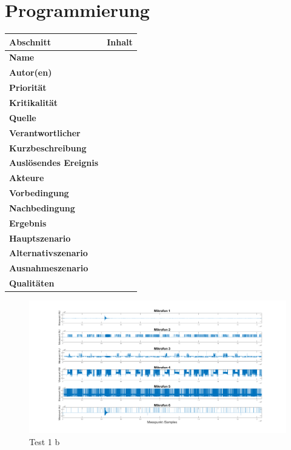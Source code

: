 \section{Programmierung}

\begin{tabularx}{\columnwidth}{|p{4cm}|X|}
	\hline
	\textbf{Abschnitt} & \textbf{Inhalt}\\
	\hline
	\textbf{Name} & \\
	\hline
	\textbf{Autor(en)} & \\
	\hline
	\textbf{Priorität} & \\	
	\hline	
	\textbf{Kritikalität} &\\
	\hline
	\textbf{Quelle} & \\
	\hline
	\textbf{Verantwortlicher} & \\
	\hline
	\textbf{Kurzbeschreibung} & \\
	\hline
	\textbf{Auslösendes Ereignis} & \\
	\hline
	\textbf{Akteure} & \\
	\hline
	\textbf{Vorbedingung} & \\
	\hline
	\textbf{Nachbedingung} & \\
	\hline
	\textbf{Ergebnis} & \\
	\hline
	\textbf{Hauptszenario} &\\
	\hline
	\textbf{Alternativszenario} & \\
	\hline
	\textbf{Ausnahmeszenario} & \\
	\hline
	\textbf{Qualitäten} & \\
	\hline
\end{tabularx}
\label{tab:}

\newpage
%

\begin{figure}[h]
	\begin{center}
		\includegraphics[width=\textwidth]{Sections/Programmierung/Test_1_c}
	\end{center}
	\caption{Test 1 b}
	\label{fig:Test_1_b}
\end{figure}

\newpage